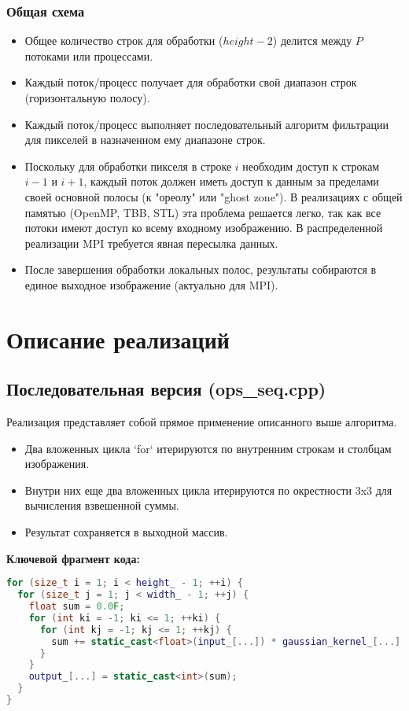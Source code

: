 \documentclass[12pt,a4paper]{extarticle}
\begin{document}
\subsubsection{Общая схема}
\begin{itemize}
    \item Общее количество строк для обработки (\(height-2\)) делится между \(P\) потоками или процессами.
    \item Каждый поток/процесс получает для обработки свой диапазон строк (горизонтальную полосу).
    \item Каждый поток/процесс выполняет последовательный алгоритм фильтрации для пикселей в назначенном ему диапазоне строк.
    \item Поскольку для обработки пикселя в строке \(i\) необходим доступ к строкам \(i-1\) и \(i+1\), каждый поток должен иметь доступ к данным за пределами своей основной полосы (к "ореолу" или "ghost zone"). В реализациях с общей памятью (OpenMP, TBB, STL) эта проблема решается легко, так как все потоки имеют доступ ко всему входному изображению. В распределенной реализации MPI требуется явная пересылка данных.
    \item После завершения обработки локальных полос, результаты собираются в единое выходное изображение (актуально для MPI).
\end{itemize}

\newpage
\section{Описание реализаций}

\subsection{Последовательная версия (ops\_seq.cpp)}
Реализация представляет собой прямое применение описанного выше алгоритма.
\begin{itemize}
    \item Два вложенных цикла `for` итерируются по внутренним строкам и столбцам изображения.
    \item Внутри них еще два вложенных цикла итерируются по окрестности 3x3 для вычисления взвешенной суммы.
    \item Результат сохраняется в выходной массив.
\end{itemize}

\textbf{Ключевой фрагмент кода:}
\begin{lstlisting}[language=C++]
for (size_t i = 1; i < height_ - 1; ++i) {
  for (size_t j = 1; j < width_ - 1; ++j) {
    float sum = 0.0F;
    for (int ki = -1; ki <= 1; ++ki) {
      for (int kj = -1; kj <= 1; ++kj) {
        sum += static_cast<float>(input_[...]) * gaussian_kernel_[...];
      }
    }
    output_[...] = static_cast<int>(sum);
  }
}
\end{lstlisting}
\end{document}
